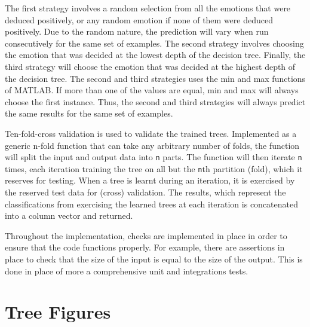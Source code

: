\documentclass[a4paper]{article}
\begin{document}
The first strategy involves a random selection from all the emotions that were deduced positively, or any random emotion if none of them were deduced positively. Due to the random nature, the prediction will vary when run consecutively for the same set of examples. The second strategy involves choosing the emotion that was decided at the lowest depth of the decision tree. Finally, the third strategy will choose the emotion that was decided at the highest depth of the decision tree. The second and third strategies uses the min and max functions of MATLAB. If more than one of the values are equal,  min and max will always choose the first instance. Thus, the second and third strategies will always predict the same results for the same set of examples.\medskip

Ten-fold-cross validation is used to validate the trained trees. Implemented as a generic n-fold function that can take any arbitrary number of folds, the function will split the input and output data into \texttt{n} parts. The function will then iterate \texttt{n} times, each iteration training the tree on all but the \texttt{n}th partition (fold), which it reserves for testing. When a tree is learnt during an iteration, it is exercised by the reserved test data for (cross) validation. The results, which represent the classifications from exercising the learned trees at each iteration is concatenated into a column vector and returned. \medskip

Throughout the implementation, checks are implemented in place in order to ensure that the code functions properly. For example, there are assertions in place to check that the size of the input is equal to the size of the output. This is done in place of more a comprehensive unit and integrations tests.

\clearpage


\section{Tree Figures}
\end{document}
